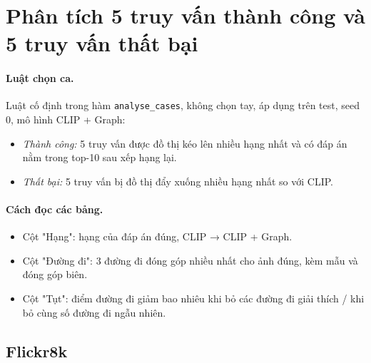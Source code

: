 \documentclass[11pt,a4paper]{article}
\begin{document}
\section{Phân tích 5 truy vấn thành công và 5 truy vấn thất bại}\label{sec:cases}

\paragraph{Luật chọn ca.} Luật cố định trong hàm \texttt{analyse\_cases}, không chọn tay, áp dụng trên test, seed 0, mô hình CLIP + Graph:
\begin{itemize}
  \item \emph{Thành công:} 5 truy vấn được đồ thị kéo lên nhiều hạng nhất và có đáp án nằm trong top-10 sau xếp hạng lại.
  \item \emph{Thất bại:} 5 truy vấn bị đồ thị đẩy xuống nhiều hạng nhất so với CLIP.
\end{itemize}

\paragraph{Cách đọc các bảng.}
\begin{itemize}
  \item Cột "Hạng": hạng của đáp án đúng, CLIP → CLIP + Graph.
  \item Cột "Đường đi": 3 đường đi đóng góp nhiều nhất cho ảnh đúng, kèm mẫu và đóng góp biên.
  \item Cột "Tụt": điểm đường đi giảm bao nhiêu khi bỏ các đường đi giải thích / khi bỏ cùng số đường đi ngẫu nhiên.
\end{itemize}

\subsection{Flickr8k}
\end{document}
